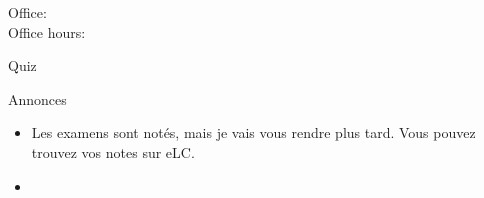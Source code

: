 \documentclass{beamer}
\subtitle[Adjectifs prénominaux]{Les adjectifs prénominaux}
\begin{document}
  \begin{frame}
    \titlepage
    \tiny{Office: \\
          Office hours: }
  \end{frame}

  \begin{frame}{}
    \begin{center}
      \Large Quiz
    \end{center}
  \end{frame}

  \begin{frame}{Annonces}
    \begin{itemize}
      \item Les examens sont notés, mais je vais vous rendre plus tard. Vous pouvez trouvez vos notes sur eLC.
      \item[] 
    \end{itemize}
  \end{frame}
\end{document}

